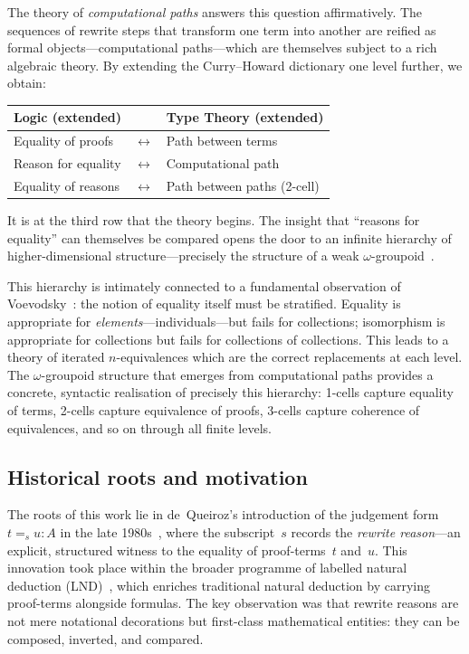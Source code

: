 \documentclass[manuscript]{BSLstyle}
\begin{document}
The theory of \emph{computational paths} answers this question
affirmatively.  The sequences of rewrite steps that transform one term
into another are reified as formal objects---computational paths---which
are themselves subject to a rich algebraic theory.  By extending the
Curry--Howard dictionary one level further, we obtain:

\begin{center}
\small
\begin{tabular}{lcp{4.2cm}}
\toprule
\textbf{Logic (extended)} & & \textbf{Type Theory (extended)} \\
\midrule
Equality of proofs & $\leftrightarrow$ & Path between terms \\
Reason for equality & $\leftrightarrow$ & Computational path \\
Equality of reasons & $\leftrightarrow$ & Path between paths (2-cell) \\
\bottomrule
\end{tabular}
\end{center}

\noindent
It is at the third row that the theory begins.  The insight that ``reasons
for equality'' can themselves be compared opens the door to an infinite
hierarchy of higher-dimensional structure---precisely the structure of a
weak $\omega$-groupoid~\cite{Grothendieck83,Batanin98,Leinster04}.

This hierarchy is intimately connected to a fundamental observation
of Voevodsky~\cite{Voevodsky2014HTF}: the notion of equality itself
must be stratified.  Equality is appropriate for
\emph{elements}---individuals---but fails for collections; isomorphism
is appropriate for collections but fails for collections of collections.
This leads to a theory of iterated $n$-equivalences which are the correct
replacements at each level.  The $\omega$-groupoid structure that emerges
from computational paths provides a concrete, syntactic realisation of
precisely this hierarchy: 1-cells capture equality of terms, 2-cells
capture equivalence of proofs, 3-cells capture coherence of equivalences,
and so on through all finite levels.

\subsection{Historical roots and motivation}

The roots of this work lie in de~Queiroz's introduction of the judgement
form $t =_s u : A$ in the late 1980s~\cite{deQueiroz88:dialectica,deQueiroz89,deQueiroz90:phd},
where the subscript~$s$ records the \emph{rewrite reason}---an explicit,
structured witness to the equality of proof-terms~$t$ and~$u$.  This
innovation took place within the broader programme of labelled natural
deduction (LND)~\cite{GabbaydeQueiroz92:c-h:full,Gabbay96:LDS}, which
enriches traditional natural deduction by carrying proof-terms alongside
formulas.  The key observation was that rewrite reasons are not mere
notational decorations but first-class mathematical entities: they can be
composed, inverted, and compared.
\end{document}
